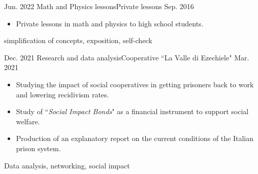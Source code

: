 %
%
%
\begin{experiences}
    \experience 
   {Jun. 2022}   {Math and Physics lessons}{Private lessons}{}
    {Sep. 2016} {\begin{itemize}
                       \item  Private lessons in math and physics to high school students.   
                      \end{itemize}} {simplification of concepts, exposition, self-check}
    \emptySeparator

   \experience
      {Dec. 2021}   {Research and data analysis}{Cooperative ``La Valle di Ezechiele"}{}
    {Mar. 2021} {\begin{itemize}
                       \item Studying the impact of social cooperatives in getting prisoners back to work and lowering recidivism rates.
                       \item Study of ``\textit{Social Impact Bonds}" as a financial instrument to support social welfare.
                      \item Production of an explanatory report on the current conditions of the Italian prison system.        
                      \end{itemize}
                    }
                    {Data analysis, networking, social impact}
\end{experiences}

\vspace{0.2cm}
